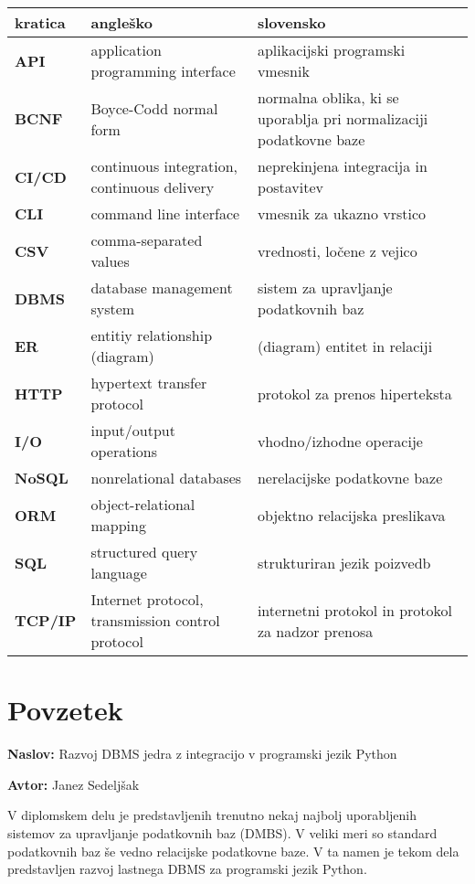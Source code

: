 \documentclass[a4paper,12pt,openright]{book}
\newcommand{\ttitle}{Razvoj DBMS jedra z integracijo v programski jezik Python}
\newcommand{\tauthor}{Janez Sedeljšak}
\newcommand{\clearemptydoublepage}{\newpage{\pagestyle{empty}\cleardoublepage}}
\begin{document}
\noindent\begin{tabular}{p{}|p{}|p{}}
  {\bf kratica} & {\bf angleško}                              & {\bf slovensko} \\ \hline
  {\bf API} & application programming interface & aplikacijski programski vmesnik \\
  {\bf BCNF} & Boyce-Codd normal form & normalna oblika, ki se uporablja pri normalizaciji podatkovne baze \\
  {\bf CI/CD} & continuous integration, continuous delivery & neprekinjena integracija in postavitev \\
  {\bf CLI} & command line interface & vmesnik za ukazno vrstico \\
  {\bf CSV} & comma-separated values & vrednosti, ločene z vejico \\
  {\bf DBMS} & database management system & sistem za upravljanje podatkovnih baz \\
  {\bf ER} & entitiy relationship (diagram) & (diagram) entitet in relaciji \\
  {\bf HTTP} & hypertext transfer protocol & protokol za prenos hiperteksta \\
  {\bf I/O} & input/output operations & vhodno/izhodne operacije \\
  {\bf NoSQL} & nonrelational databases & nerelacijske podatkovne baze \\
  {\bf ORM} & object-relational mapping & objektno relacijska preslikava \\
  {\bf SQL} & structured query language & strukturiran jezik poizvedb \\
  {\bf TCP/IP} & Internet protocol, transmission control protocol & internetni protokol in protokol za nadzor prenosa \\
\end{tabular}


\clearemptydoublepage

{}
\chapter*{Povzetek}

\noindent\textbf{Naslov:} \ttitle
\bigskip

\noindent\textbf{Avtor:} \tauthor
\bigskip

\noindent V diplomskem delu je predstavljenih trenutno nekaj najbolj uporabljenih sistemov za upravljanje podatkovnih baz (DMBS). V veliki meri so standard podatkovnih baz še vedno relacijske podatkovne baze. V ta namen je tekom dela predstavljen razvoj lastnega DBMS za programski jezik Python.
\end{document}
